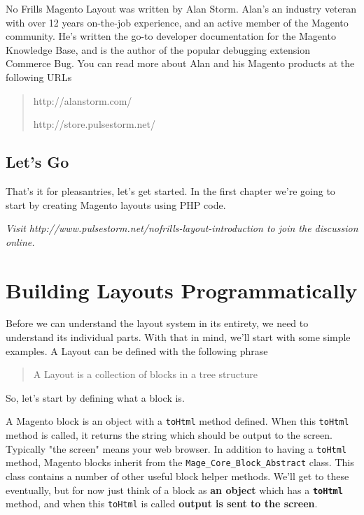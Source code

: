 \documentclass[oneside]{book}
\begin{document}
No Frills Magento Layout was written by Alan Storm.  Alan's an industry veteran with over 12 years on-the-job experience, and an active member of the Magento community.  He's written the go-to developer documentation for the Magento Knowledge Base, and is the author of the popular debugging extension Commerce Bug.  You can read more about Alan and his Magento products at the following URLs

\begin{quote}
http://alanstorm.com/

  http://store.pulsestorm.net/
\end{quote}

\section{Let's Go}

That's it for pleasantries, let's get started.  In the first chapter we're going to start by creating Magento layouts using PHP code. 

\emph{Visit http://www.pulsestorm.net/nofrills-layout-introduction to join the discussion online.}
\chapter{Building Layouts Programmatically}
Before we can understand the layout system in its entirety, we need to understand its individual parts. With that in mind, we'll start with some simple examples.  A Layout can be defined with the following phrase

\begin{quote}
A Layout is a collection of blocks in a tree structure
\end{quote}

So, let's start by defining what a block is.

A Magento block is an object with a \footnotesize\texttt{toHtml} \normalsize  method defined.  When this \footnotesize\texttt{toHtml} \normalsize  method is called, it returns the string which should be output to the screen. Typically "the screen" means your web browser.  In addition to having a \footnotesize\texttt{toHtml} \normalsize  method, Magento blocks inherit from the \footnotesize\texttt{Mage\_Core\_Block\_Abstract} \normalsize  class. This class contains a number of other useful block helper methods.  We'll get to these eventually, but for now just think of a block as \textbf{an object} which has a \textbf{\footnotesize\texttt{toHtml} \normalsize } method, and when this \footnotesize\texttt{toHtml} \normalsize  is called \textbf{output is sent to the screen}.
\end{document}
